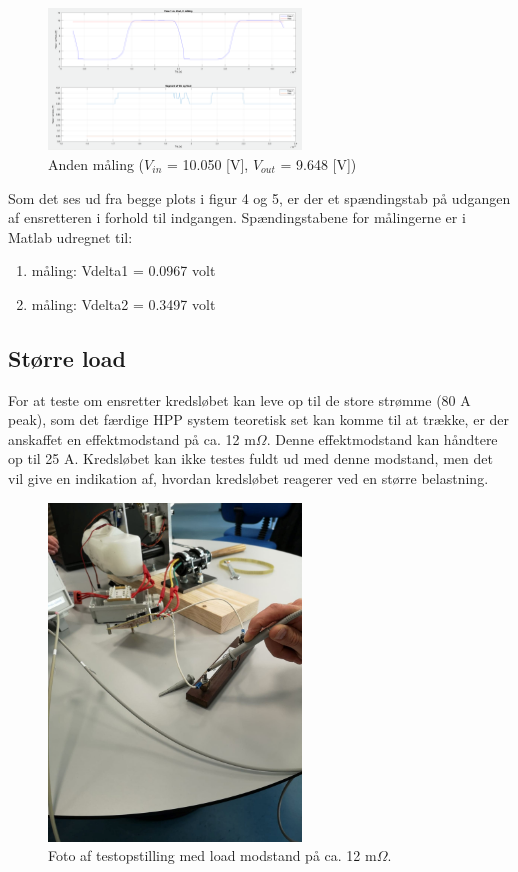\begin{figure}[h]
  \centering
  \includegraphics[width=0.6\textwidth]{tbil3.png}
  \caption{Anden måling ($V_ {in}$ = 10.050 [V], $V_{out}$ = 9.648 [V])}
  \label{fig:tbil3}
\end{figure}

Som det ses ud fra begge plots i figur 4 og 5, er der et spændingstab på udgangen af ensretteren i forhold til indgangen. Spændingstabene for målingerne er i Matlab udregnet til:

\begin{enumerate}
\item måling:	Vdelta1 = 0.0967 volt
\item måling:	Vdelta2 = 0.3497 volt
\end{enumerate}

\subsection{Større load}
\label{sec:storre-load}

For at teste om ensretter kredsløbet kan leve op til de store strømme (80 A peak), som det færdige HPP system teoretisk set kan komme til at trække, er der anskaffet en effektmodstand på ca. 12 m$\Omega$. Denne effektmodstand kan håndtere op til 25 A. Kredsløbet kan ikke testes fuldt ud med denne modstand, men det vil give en indikation af, hvordan kredsløbet reagerer ved en større belastning.
\clearpage
\begin{figure}[h]
  \centering
  \includegraphics[width=0.6\textwidth]{tbil4.jpg}
  \caption{Foto af testopstilling med load modstand på ca. 12 m$\Omega$.}
  \label{fig:tbil4}
\end{figure}


